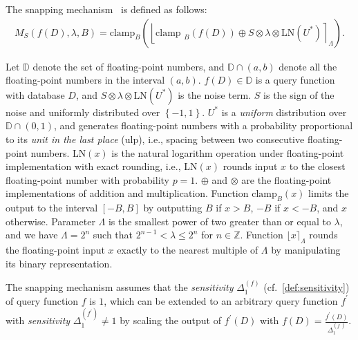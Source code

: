 
The snapping mechanism~\cite{mironov2012significance} is defined as follows:
\begin{equation}
    \begin{split}
        M_{S}\left(f\left(D\right),\lambda,B\right) =\text{clamp}_{B}\left(\left\lfloor\text {clamp }_{B}\left(f\left(D\right) \right) \oplus S\otimes \lambda\otimes \text{LN}\left(U^{*}\right) \right\rceil_{\Lambda}\right).
    \end{split}
\end{equation}


Let $\mathbb{D}$ denote the set of floating-point numbers, and $\mathbb{D} \cap \left(a,b\right) $ denote all the floating-point numbers in the interval $\left(a,b\right)$.
$f\left(D\right) \in \mathbb{D} $ is a query function with database $D$, and $S\otimes \lambda\otimes \text{LN}\left(U^{*}\right)$ is the noise term.
$S$ is the sign of the noise and uniformly distributed over $\left\{-1,1\right\} $. $U^{*}$ is a \textit{uniform} distribution over $\mathbb{D} \cap \left(0,1\right) $, and generates floating-point numbers with a probability proportional to its \textit{unit in the last place} (ulp), i.e., spacing between two consecutive floating-point numbers. $\text{LN}(x )$ is the natural logarithm operation under floating-point implementation with exact rounding, i.e., $\text{LN}(x )$ rounds input $x$ to the closest floating-point number with probability $p=1$.
$\oplus$ and $\otimes$ are the floating-point implementations of addition and multiplication.
Function $\text{clamp}_{B}\left(x\right) $ limits the output to the interval $\left[-B, B\right] $ by outputting $B$ if $x > B$, $-B$ if $x < -B$, and $x$ otherwise. Parameter $\Lambda$ is the smallest power of two greater than or equal to $\lambda$, and we have $\Lambda=2^{n}$ such that $2^{n-1} < \lambda \leq2^{n}$ for $n \in \mathbb{Z} $. Function $\lfloor x\rceil_{\Lambda}$ rounds the floating-point input $x$ exactly to the nearest multiple of $\Lambda$ by manipulating its binary representation.

The snapping mechanism assumes that the \textit{sensitivity} $\Delta_1 ^{\left(f\right) } $ (cf.~\autoref{def:sensitivity}) of query function $f$ is $1$, which can be extended to an arbitrary query function $f^{\prime}$ with \textit{sensitivity} $\Delta _1^{\left(f^{\prime}\right) }\neq 1$ by scaling the output of $f^{\prime}\left(D\right) $ with $f\left(D\right) =\frac{f^{\prime}\left(D\right) }{\Delta_1 ^{\left(f^{\prime}\right) }}$.

